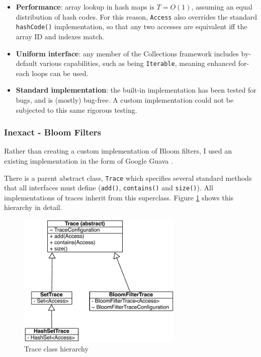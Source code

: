 		\begin{itemize}
			\item \textbf{Performance}: array lookup in hash maps is $T=O(1)$, assuming an equal distribution of hash codes. For this reason, \texttt{Access} also overrides the standard \texttt{hashCode()} implementation, so that any two accesses are equivalent iff the array ID and indexes match.
			
			\item \textbf{Uniform interface}: any member of the Collections framework includes by-default various capabilities, such as being \texttt{Iterable}, meaning enhanced for-each loops can be used.
			
			\item \textbf{Standard implementation}: the built-in implementation has been tested for bugs, and is (mostly) bug-free. A custom implementation could not be subjected to this same rigorous testing.
		\end{itemize}
		
		\subsubsection{Inexact - Bloom Filters} \label{sec:runtime/implementation/trace/bloom}
			Rather than creating a custom implementation of Bloom filters, I used an existing implementation in the form of Google Guava \citep{GuavaBloomFilter}.\
		
		There is a parent abstract class, \texttt{Trace} which specifies several standard methods that all interfaces must define (\texttt{add()}, \texttt{contains()} and \texttt{size()}). All implementations of traces inherit from this superclass. Figure \ref{fig:trace-classes} shows this hierarchy in detail.
		
		\begin{figure}
			\centering
			\includegraphics[width=0.7\textwidth]{graphics/trace-classes.pdf}
			\caption{Trace class hierarchy}
			\label{fig:trace-classes}
		\end{figure}
		
